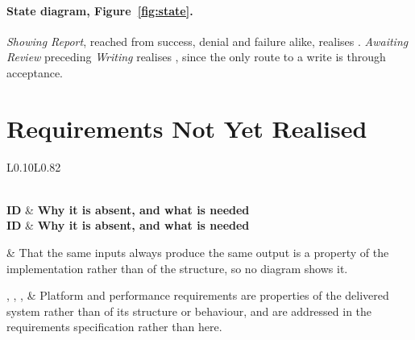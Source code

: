 \paragraph{State diagram, Figure~\ref{fig:state}.}
\emph{Showing Report}, reached from success, denial and failure alike, realises
. \emph{Awaiting Review} preceding \emph{Writing} realises
, since the only route to a write is through acceptance.

\section{Requirements Not Yet Realised}

\begin{longtable}{L{0.10\textwidth}L{0.82\textwidth}}
	\caption{Gaps against the requirements}\label{tab:omissions}\\
	\toprule
	\textbf{ID} & \textbf{Why it is absent, and what is needed} \\
	\midrule
	\endfirsthead
	\toprule
	\textbf{ID} & \textbf{Why it is absent, and what is needed} \\
	\midrule
	\endhead

	 & That the same inputs always produce the same output is a
	property of the implementation rather than of the structure, so no diagram
	shows it. \\
	\addlinespace

	, , ,  & Platform and performance
	requirements are properties of the delivered system rather than of its
	structure or behaviour, and are addressed in the requirements specification
	rather than here. \\
	\bottomrule
\end{longtable}